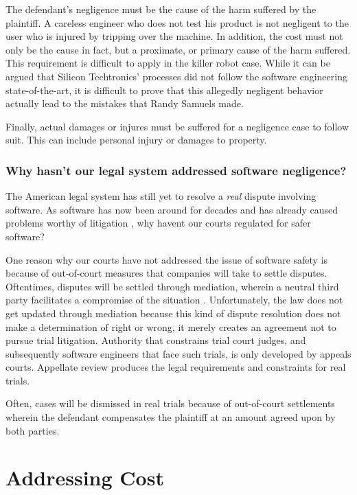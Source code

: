 \documentclass[12pt]{report}
\begin{document}
The defendant's negligence must be the cause of the harm suffered by the plaintiff. A careless engineer who does not test his product is not negligent to the user who is injured by tripping over the machine. In addition, the cost must not only be the cause in fact, but a proximate, or primary cause of the harm suffered. This requirement is difficult to apply in the killer robot case. While it can be argued that Silicon Techtronics' processes did not follow the software engineering state-of-the-art, it is difficult to prove that this allegedly negligent behavior actually lead to the mistakes that Randy Samuels made.

Finally, actual damages or injures must be suffered for a negligence case to follow suit. This can include personal injury or damages to property.

\subsubsection{Why hasn't our legal system addressed software negligence?} 

The American legal system has still yet to resolve a \textit{real} dispute involving software. As software has now been around for decades and has already caused problems worthy of litigation \cite{FAKE}, why havent our courts regulated for safer software? 

One reason why our courts have not addressed the issue of software safety is because of out-of-court measures that companies will take to settle disputes. Oftentimes, disputes will be settled through mediation, wherein a neutral third party facilitates a compromise of the situation \cite{FAKE}. Unfortunately, the law does not get updated through mediation because this kind of dispute resolution does not make a determination of right or wrong, it merely creates an agreement not to pursue trial litigation. Authority that constrains trial court judges, and subsequently software engineers that face such trials, is only developed by appeals courts. Appellate review produces the legal requirements and constraints for real trials. 

Often, cases will be dismissed in real trials because of out-of-court settlements wherein the defendant compensates the plaintiff at an amount agreed upon by both parties.

\section{Addressing Cost}
\end{document}
